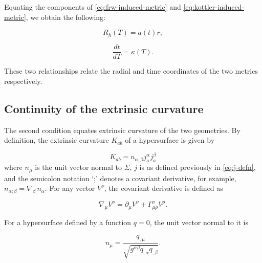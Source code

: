Equating the components of \autoref{eq:frw-induced-metric} and \autoref{eq:kottler-induced-metric}, we obtain the following:

\begin{equation}
  R_h(T) = a(t)r
  \label{eq:r-to-ar},
\end{equation}

\begin{equation}
  \frac{dt}{dT} = \kappa(T).
  \label{eq:dt-dT}
\end{equation}


These two relationships relate the radial and time coordinates of the two metrics respectively. 

\subsection{Continuity of the extrinsic curvature}

The second condition equates extrinsic curvature of the two geometries. By definition, the extrinsic curvature $K_{ab}$ of a hypersurface is given by

\begin{equation}
  K_{ab} = n_{\alpha;\beta} j^{\alpha}_{a} j^{\beta}_{a}
  \label{eq:extrinsic-curvature-defn}
\end{equation}
where $n_{\mu}$ is the unit vector normal to $\Sigma$, $j$ is as defined previously in \autoref{eq:j-defn}, and the semicolon notation `;' denotes a covariant derivative, for example, $n_{\alpha;\beta} = \nabla_{\beta}\, n_{\alpha}$. For any vector $V^{\nu}$, the covariant derivative is defined as

\begin{equation}
  \nabla_{\mu}V^{\nu} = \partial_{\mu}V^{\nu} + \Gamma^{\nu}_{\mu \rho} V^{\rho}.
  \label{eq:covariant-derivative-defn}
\end{equation}

For a hypersurface defined by a function $q = 0$, the unit vector normal to it is

\begin{equation}
  n_{\mu} = \frac{q_{,\mu}}{\sqrt{g^{\alpha \beta} q_{,\alpha} q_{,\beta}}}.
  \label{eq:unit-normal-vector}
\end{equation}

